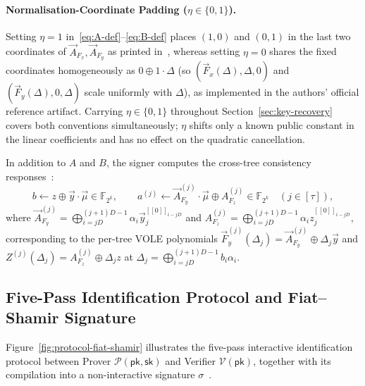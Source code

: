 \documentclass[11pt,a4paper]{article}
\theoremstyle{definition}
\theoremstyle{remark}
\newcommand{\Ftwok}{\mathbb{F}_{2^k}}
\newcommand{\pk}{\mathsf{pk}}
\newcommand{\sk}{\mathsf{sk}}
\newcommand{\share}[1]{[\![#1]\!]}
\begin{document}
\paragraph{Normalisation-Coordinate Padding ($\eta \in \{0, 1\}$).}
Setting $\eta = 1$ in~\eqref{eq:A-def}--\eqref{eq:B-def} places $(1, 0)$ and $(0, 1)$ in the last two coordinates of $\vec{A}_{F_x}, \vec{A}_{F_y}$ as printed in~\cite[Figure~5]{HJ25}, whereas setting $\eta = 0$ shares the fixed coordinates homogeneously as $0 \oplus 1 \cdot \Delta$ (so $(\vec{F}_x(\Delta), \Delta, 0)$ and $(\vec{F}_y(\Delta), 0, \Delta)$ scale uniformly with $\Delta$), as implemented in the authors' official reference artifact. Carrying $\eta \in \{0, 1\}$ throughout Section~\ref{sec:key-recovery} covers both conventions simultaneously; $\eta$ shifts only a known public constant in the linear coefficients and has no effect on the quadratic cancellation.

In addition to $A$ and $B$, the signer computes the cross-tree consistency responses~\cite{HJ25}:
\begin{equation}
\label{eq:b-aj}
b \leftarrow z \oplus \vec{y} \cdot \vec{\mu} \in \Ftwok, \qquad
a^{(j)} \leftarrow \vec{A}_{F_y}^{(j)} \cdot \vec{\mu} \oplus A_{F_z}^{(j)} \in \Ftwok \quad (j \in [\tau]),
\end{equation}
where $\vec{A}_{F_y}^{(j)} = \bigoplus_{i=jD}^{(j+1)D-1} \alpha_i \vec{y}_j^{\share{0}_{i-jD}}$ and $A_{F_z}^{(j)} = \bigoplus_{i=jD}^{(j+1)D-1} \alpha_i z_j^{\share{0}_{i-jD}}$, corresponding to the per-tree VOLE polynomials $\vec{F}_y^{(j)}(\Delta_j) = \vec{A}_{F_y}^{(j)} \oplus \Delta_j \vec{y}$ and $Z^{(j)}(\Delta_j) = A_{F_z}^{(j)} \oplus \Delta_j z$ at $\Delta_j = \bigoplus_{i=jD}^{(j+1)D-1} b_i \alpha_i$.

\subsection{Five-Pass Identification Protocol and Fiat--Shamir Signature}
\label{subsec:fs-vulnerability}
Figure~\ref{fig:protocol-fiat-shamir} illustrates the five-pass interactive identification protocol between Prover $\mathcal{P}(\pk, \sk)$ and Verifier $\mathcal{V}(\pk)$, together with its compilation into a non-interactive signature $\sigma$~\cite[Sections~4--5]{HJ25}.
\end{document}

